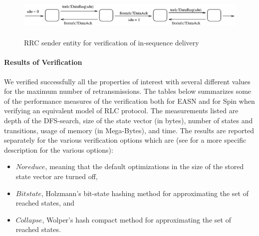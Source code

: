 \documentclass{entcs} \usepackage{entcsmacro}
\begin{document}

\begin{figure}
\begin{center}
  \includegraphics[height=1.5cm]{rrcs.eps}\\
  \caption{RRC sender entity for verification of in-sequence delivery}
  \label{rrcsender}
\end{center}
\end{figure}

\paragraph{Results of Verification}

We verified successfully all the properties of interest with several
different values for the maximum number of retransmissions. The tables
below summarizes some of the performance measures of the verification
both for EASN and for Spin when verifying an equivalent model of RLC
protocol.  The measurements listed are depth of the DFS-search, size
of the state vector (in bytes), number of states and transitions,
usage of memory (in Mega-Bytes), and time. The results are reported
separately for the various verification options which are (see
\cite{Spin} for a more specific description for the various options):

\begin{itemize}
\item $Noreduce$, meaning that the default optimizations in the
size of the stored state vector are turned off, 
\item $Bitstate$, Holzmann's bit-state hashing method
for approximating the set of reached states, and
\item $Collapse$, Wolper's hash compact method 
for approximating the set of reached states.
\end{itemize}
\end{document}
